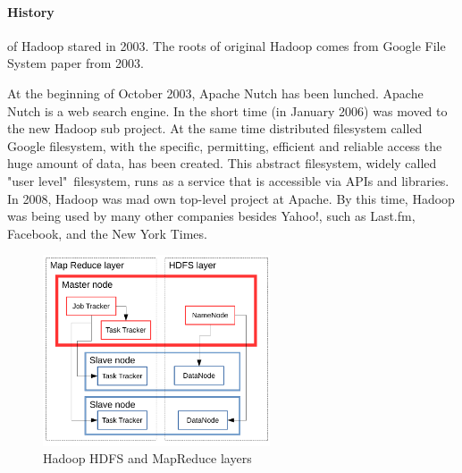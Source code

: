 \documentclass[a4paper,12pt,oneside]{report}
\begin{document}
	\paragraph*{History} of Hadoop stared in 2003. The roots of original Hadoop
	comes from Google File System paper from 2003. 
	
	At the beginning of October 2003, Apache Nutch\cite{nutch_web} has been lunched.
	Apache Nutch is a  web search engine. In the short time (in January 2006) was
	moved to the new Hadoop sub project.
	At the same time  distributed filesystem called Google
	filesystem\cite{google_fs}, with the specific, permitting, efficient and
	reliable access
	the huge amount of data, has been created. This abstract filesystem, widely
	called "user level"~filesystem, runs as a service that is accessible via APIs and libraries. 
	In 2008, Hadoop was mad own top-level project at Apache.\cite{hadoop_web_news}
	By this time, Hadoop was being used by many
	other companies besides Yahoo!, such as Last.fm, Facebook, and the New York
	Times. 
	
	\begin{figure}[!htbp]
		\centering
		\includegraphics[width=0.6\textwidth]{./img/schema2.pdf}
		\caption[Hadoop architecture2]{\centering Hadoop HDFS and MapReduce layers}
	\end{figure} 
	
	
	
\end{document}
